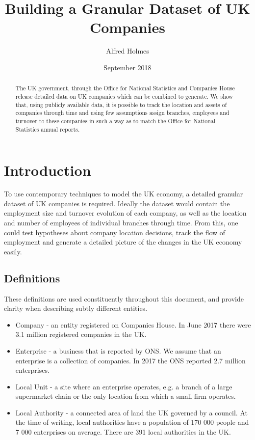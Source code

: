 \documentclass[a4paper,10pt]{article}
\title{Building a Granular Dataset of UK Companies}
\author{Alfred Holmes}
\date{September 2018}
\begin{document}
   \maketitle
   \begin{abstract}
   The UK government, through the Office for National Statistics and Companies House release detailed data on UK companies which can be combined to generate. We show that, using publicly available data, it is possible to track the location and assets of companies through time and using few assumptions assign branches, employees and turnover to these companies in such a way as to match the Office for National Statistics annual reports.
   \end{abstract}
   \section{Introduction}
   To use contemporary techniques to model the UK economy, a detailed granular dataset of UK companies is required. Ideally the dataset would contain the employment size and turnover evolution of each company, as well as the location and number of employees of individual branches through time. From this, one could test hypotheses about company location decisions, track the flow of employment and generate a detailed picture of the changes in the UK economy easily.
   \subsection{Definitions}
   These definitions are used constituently throughout this document, and provide clarity when describing subtly different entities.
   \begin{itemize}
 	\item Company - an entity registered on Companies House. In June 2017 there were 3.1 million registered companies in the UK. 
 	\item Enterprise - a business that is reported by ONS. We assume that an enterprise is a collection of companies. In 2017 the ONS reported 2.7 million enterprises.
 	\item Local Unit - a site where an enterprise operates, e.g. a branch of a large supermarket chain or the only location from which a small firm operates.
 	\item Local Authority - a connected area of land the UK governed by a council. At the time of writing, local authorities have a population of 170 000 people and 7 000 enterprises on average. There are 391 local authorities in the UK.
   \end{itemize}
\end{document}

